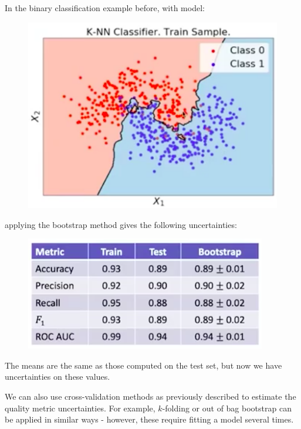 \begin{frameex}
In the binary classification example before, with model:
\begin{figure}[H]
\centering
\includegraphics[scale=0.4]{fittedclassifier.png}
\end{figure}
applying the bootstrap method gives the following uncertainties:
\begin{figure}[H]
\centering
\includegraphics[scale=0.4]{bootstrapuncertainties.png}
\end{figure}
The means are the same as those computed on the test set, but now we have uncertainties on these values.
\end{frameex}

We can also use cross-validation methods as previously described to estimate the quality metric uncertainties. For example, $k$-folding or out of bag bootstrap can be applied in similar ways - however, these require fitting a model several times.



\newpage
